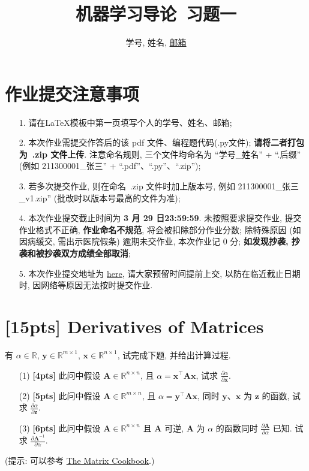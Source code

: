 \documentclass[a4paper,UTF8]{article}
\numberwithin{equation}{section}
\theoremstyle{definition}
\def \A {\mathbf{A}}
\def \y {\mathbf{y}}
\def \x {\mathbf{x}}
\def \z {\mathbf{z}}
\begin{document}
\title{机器学习导论\ 习题一}
\author{学号, 姓名, \href{mailto:邮箱}{邮箱}}
\maketitle
\section*{作业提交注意事项}
\begin{tcolorbox}
	\begin{enumerate}
		\item[1.] 请在LaTeX模板中第一页填写个人的学号、姓名、邮箱;
		\item[2.] 本次作业需提交作答后的该 pdf 文件、编程题代码(.py文件); {\color{red}\textbf{请将二者打包为~.zip 文件上传}}. 注意命名规则, 三个文件均命名为 “学号\_姓名” + “.后缀” (例如 211300001\_张三” + “.pdf”、“.py”、“.zip”);
		\item[3.] 若多次提交作业, 则在命名~.zip 文件时加上版本号, 例如 211300001\_张三\_v1.zip” (批改时以版本号最高的文件为准);
		\item[4.] 本次作业提交截止时间为 {\color{red}\textbf{ 3 月 29 日23:59:59}}. 未按照要求提交作业, 提交作业格式不正确, {\color{red}\textbf{作业命名不规范}}, 将会被扣除部分作业分数; 除特殊原因 (如因病缓交, 需出示医院假条) 逾期未交作业, 本次作业记 0 分; {\color{red}\textbf{如发现抄袭, 抄袭和被抄袭双方成绩全部取消}};
		\item[5.] 本次作业提交地址为 \href{https://box.nju.edu.cn/u/d/008080744a60484ea526/}{here}, 请大家预留时间提前上交, 以防在临近截止日期时, 因网络等原因无法按时提交作业.
	\end{enumerate}
\end{tcolorbox}
\newpage


\section{[15pts] Derivatives of Matrices}
 有 $\alpha \in \mathbb{R}$, $\y\in \mathbb{R}^{m×1}$, $\x\in \mathbb{R}^{n×1}$, 试完成下题, 并给出计算过程.
\begin{enumerate}
	\item[(1)] \textbf{[4pts]} 此问中假设 $\A\in \mathbb{R}^{n×n}$, 且 $\alpha=\x^\top\A\x$, 试求 $\frac{\partial \alpha}{\partial \x}$.
	\item[(2)] \textbf{[5pts]} 此问中假设 $\A\in \mathbb{R}^{m×n}$, 且 $\alpha=\y^\top\A\x$, 同时 $\y$、$\x$ 为 $\z$ 的函数, 试求 $\frac{\partial \alpha}{\partial \z}$.
	\item[(3)] \textbf{[6pts]} 此问中假设 $\A\in \mathbb{R}^{n×n}$ 且 $\A$ 可逆, $\A$ 为 $\alpha$ 的函数同时 $\frac{\partial \A}{\partial \alpha}$ 已知. 试求 $\frac{\partial \A^{-1}}{\partial \alpha}$.
\end{enumerate}
(提示: 可以参考 \href{https://www.math.uwaterloo.ca/~hwolkowi/matrixcookbook.pdf}{The Matrix Cookbook}.)
\end{document}
